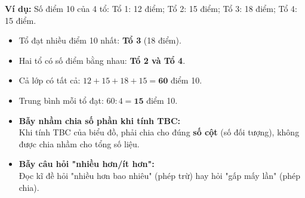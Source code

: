 \documentclass[14pt,a4paper,oneside]{extbook}
\begin{document}
\vspace{-2.5mm}
\noindent
\begin{minipage}[t]{0.49\textwidth}\vspace{0pt}
\begin{tcolorbox}[
  enhanced,
  colback=green!4!white,
  colframe=green!60!black,
  arc=2mm, boxrule=0.8pt,
  left=2mm, right=2mm, top=1.8mm, bottom=1.8mm,
  title={\footnotesize\bfseries\color{white}\faCheckCircle\ Ví dụ thực hành chuẩn mực}
]
{\footnotesize
\textbf{Ví dụ:} Số điểm 10 của 4 tổ: Tổ 1: 12 điểm; Tổ 2: 15 điểm; Tổ 3: 18 điểm; Tổ 4: 15 điểm.
\begin{itemize}\setlength{\itemsep}{1pt}\setlength{\leftskip}{-2.5mm}
  \item Tổ đạt nhiều điểm 10 nhất: \textbf{Tổ 3} (18 điểm).
  \item Hai tổ có số điểm bằng nhau: \textbf{Tổ 2 và Tổ 4}.
  \item Cả lớp có tất cả: $12 + 15 + 18 + 15 = \mathbf{60}$ điểm 10.
  \item Trung bình mỗi tổ đạt: $60 : 4 = \mathbf{15}$ điểm 10.
\end{itemize}
}
\end{tcolorbox}
\end{minipage}
\hfill
\begin{minipage}[t]{0.49\textwidth}\vspace{0pt}
\begin{tcolorbox}[
  enhanced,
  colback=red!4!white,
  colframe=red!70!black,
  arc=2mm, boxrule=0.8pt,
  left=2mm, right=2mm, top=1.8mm, bottom=1.8mm,
  title={\footnotesize\bfseries\color{white}\faExclamationTriangle\ Mẹo tránh bẫy trắc nghiệm}
]
{\footnotesize
\begin{itemize}\setlength{\itemsep}{1.5pt}\setlength{\leftskip}{-2.5mm}
  \item \textbf{Bẫy nhầm chia số phần khi tính TBC:}\\
  Khi tính TBC của biểu đồ, phải chia cho đúng \textbf{số cột} (số đối tượng), không được chia nhầm cho tổng số liệu.
  \item \textbf{Bẫy câu hỏi "nhiều hơn/ít hơn":}\\
  Đọc kĩ đề hỏi "nhiều hơn bao nhiêu" (phép trừ) hay hỏi "gấp mấy lần" (phép chia).
\end{itemize}
}
\end{tcolorbox}
\end{minipage}
\end{document}
